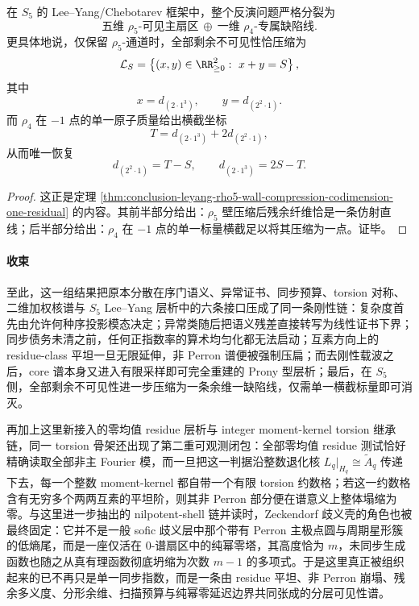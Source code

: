 \begin{corollary}\label{cor:conclusion-s5-leyang-codimension-one-defect-line}
在 \(S_5\) 的 Lee--Yang/Chebotarev 框架中，整个反演问题严格分裂为
\[
\text{五维 }\rho_5\text{-可见主扇区}
\ \oplus\
\text{一维 }\rho_4\text{-专属缺陷线}.
\]
更具体地说，仅保留 \(\rho_5\)-通道时，全部剩余不可见性恰压缩为
\[
\mathcal L_S
=
\left\{
(x,y)\in\RR_{\ge 0}^2:\ x+y=S
\right\},
\]
其中
\[
x=d_{(2\cdot 1^3)},
\qquad
y=d_{(2^2\cdot 1)}.
\]
而 \(\rho_4\) 在 \(-1\) 点的单一原子质量给出横截坐标
\[
T=d_{(2\cdot 1^3)}+2d_{(2^2\cdot 1)},
\]
从而唯一恢复
\[
d_{(2^2\cdot1)}=T-S,
\qquad
d_{(2\cdot1^3)}=2S-T.
\]
\end{corollary}
\begin{proof}
这正是定理 \ref{thm:conclusion-leyang-rho5-wall-compression-codimension-one-residual} 的内容。其前半部分给出：\(\rho_5\) 壁压缩后残余纤维恰是一条仿射直线；后半部分给出：\(\rho_4\) 在 \(-1\) 点的单一标量横截足以将其压缩为一点。证毕。
\end{proof}







\paragraph{收束}
至此，这一组结果把原本分散在序门语义、异常证书、同步预算、torsion 对称、二维加权核谱与 \(S_5\) Lee--Yang 层析中的六条接口压成了同一条刚性链：复杂度首先由允许何种序投影模态决定；异常类随后把语义残差直接转写为线性证书下界；同步债务未清之前，任何正指数率的算术均匀化都无法启动；互素方向上的 residue-class 平坦一旦无限延伸，非 Perron 谱便被强制压扁；而去刚性载波之后，core 谱本身又进入有限采样即可完全重建的 Prony 型层析；最后，在 \(S_5\) 侧，全部剩余不可见性进一步压缩为一条余维一缺陷线，仅需单一横截标量即可消灭。

再加上这里新接入的零均值 residue 层析与 integer moment-kernel torsion 继承链，同一 torsion 骨架还出现了第二重可观测闭包：全部零均值 residue 测试恰好精确读取全部非主 Fourier 模，而一旦把这一判据沿整数退化核 \(L_q|_{H_q}\cong \widetilde A_q\) 传递下去，每一个整数 moment-kernel 都自带一个有限 torsion 约数格；若这一约数格含有无穷多个两两互素的平坦阶，则其非 Perron 部分便在谱意义上整体塌缩为零。与这里进一步抽出的 nilpotent-shell 链并读时，Zeckendorf 歧义壳的角色也被最终固定：它并不是一般 sofic 歧义层中那个带有 Perron 主极点圆与周期星形簇的低熵尾，而是一座仅活在 \(0\)-谱扇区中的纯幂零塔，其高度恰为 \(m\)，未同步生成函数也随之从真有理函数彻底坍缩为次数 \(m-1\) 的多项式。于是这里真正被组织起来的已不再只是单一同步指数，而是一条由 residue 平坦、非 Perron 崩塌、残余多义度、分形余维、扫描预算与纯幂零延迟边界共同张成的分层可见性谱。

\endinput
